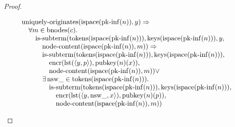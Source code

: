 \documentclass[11pt]{article}
\theoremstyle{plain}
\begin{document}
\begin{proof}
\begin{itemize}[leftmargin=2.8em, itemsep=4pt, parsep=1pt]
\begin{itemize}[leftmargin=2.8em, itemsep=4pt, parsep=1pt]
\begin{equation*}
\begin{array}{@{}l@{}}
\begin{array}{@{}l@{}} \operatorname{uniquely\text{-}originates}(\operatorname{ispace}(\operatorname{pk\text{-}inf}(n)), y) \Rightarrow  \\ \quad \forall m \in \operatorname{bnodes}(c). \\ \quad \quad \operatorname{is\text{-}subterm}(\operatorname{tokens}(\operatorname{ispace}(\operatorname{pk\text{-}inf}(n))), \operatorname{keys}(\operatorname{ispace}(\operatorname{pk\text{-}inf}(n))), y, \\ \quad \quad \quad \operatorname{node\text{-}content}(\operatorname{ispace}(\operatorname{pk\text{-}inf}(n)), m)) \Rightarrow \\ \quad \quad \quad \operatorname{is\text{-}subterm}(\operatorname{tokens}(\operatorname{ispace}(\operatorname{pk\text{-}inf}(n))), \operatorname{keys}(\operatorname{ispace}(\operatorname{pk\text{-}inf}(n))), \\ \quad \quad \quad \quad \operatorname{encr}(\operatorname{lst}(\langle y, p \rangle), \operatorname{pubkey}(n)(x)), \\ \quad \quad \quad \quad \operatorname{node\text{-}content}(\operatorname{ispace}(\operatorname{pk\text{-}inf}(n)), m)) \vee \\ \quad \quad \quad \exists \operatorname{nsw\_} \in \operatorname{tokens}(\operatorname{ispace}(\operatorname{pk\text{-}inf}(n))). \\ \quad \quad \quad \quad \operatorname{is\text{-}subterm}(\operatorname{tokens}(\operatorname{ispace}(\operatorname{pk\text{-}inf}(n))), \operatorname{keys}(\operatorname{ispace}(\operatorname{pk\text{-}inf}(n))), \\ \quad \quad \quad \quad \quad \operatorname{encr}(\operatorname{lst}(\langle y, \operatorname{nsw\_}, x \rangle), \operatorname{pubkey}(n)(p)), \\ \quad \quad \quad \quad \quad \operatorname{node\text{-}content}(\operatorname{ispace}(\operatorname{pk\text{-}inf}(n)), m)) \end{array} \\

\end{array}
\end{equation*}
\end{itemize}
\end{itemize}
\end{proof}
\end{document}
